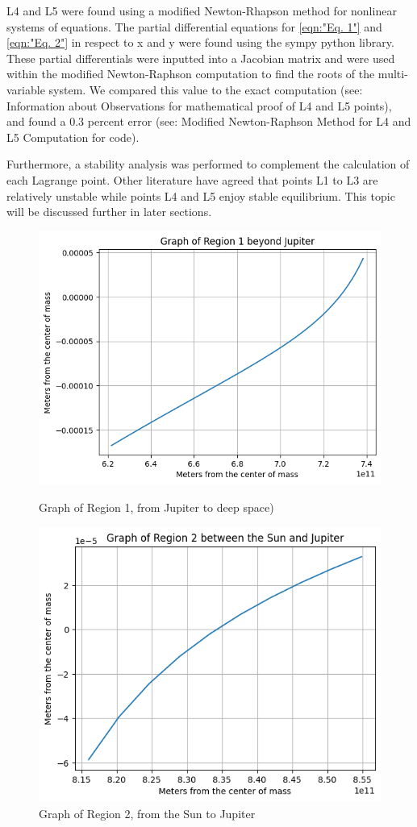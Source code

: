 \documentclass[linenumbers,RNAAS,trackchanges]{aastex631}
\begin{document}
L4 and L5 were found using a modified  Newton-Rhapson method for nonlinear systems of equations. The partial differential equations for \ref{eqn:"Eq. 1"} and \ref{eqn:"Eq. 2"}  in respect to x and y were found using the sympy python library. These partial differentials were inputted into a Jacobian matrix and were used within the modified Newton-Raphson computation to find the roots of the multi-variable system. We compared this value to the exact computation (see: Information about Observations for mathematical proof of L4 and L5 points), and found a 0.3 percent error (see: Modified Newton-Raphson Method for L4 and L5 Computation for code).



Furthermore, a stability analysis was performed to complement the calculation of each Lagrange point. Other literature have agreed that points L1 to L3 are relatively unstable while points L4 and L5 enjoy stable equilibrium. This topic will be discussed further in later sections. 

\begin{figure}[H]
    \centering
    \includegraphics[scale=.75]{l1.png}
    \caption{Graph of Region 1, from Jupiter to deep space)}
    \label{fig:asa}
    \centering
    \includegraphics[scale=.75]{l2.png}
    \caption{Graph of Region 2, from the Sun to Jupiter}
    \label{fig:code}
\end{figure}
\end{document}
